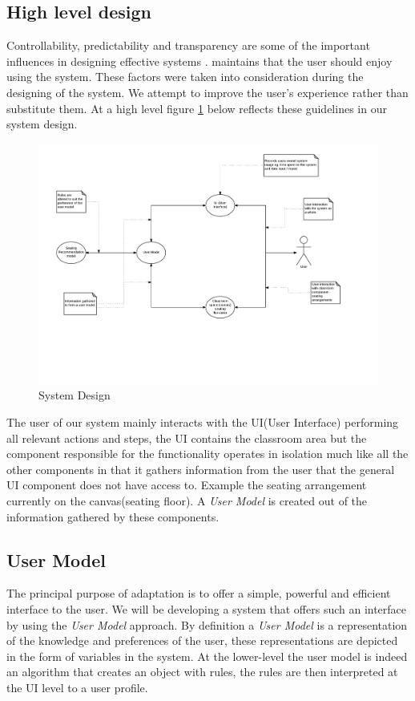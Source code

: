 \subsection{High level design}
Controllability, predictability and transparency are some of the important influences in designing effective systems \cite{hook1995glass}. \cite{rudisill1996human} maintains that the user should enjoy using the system. These factors were taken into consideration during the designing of the system. We attempt to improve the user's experience rather than substitute them. At a high level figure \ref{fig:SystemDesign} below reflects these guidelines in our system design.

\begin{figure}[!ht]
\caption{System Design}
    \label{fig:SystemDesign}
    \centering
    \includegraphics[scale=0.5]{figures/SystemDesign}
\end{figure}


The user of our system mainly interacts with the UI(User Interface) performing all relevant actions and steps, the UI contains the classroom area but the component responsible for the functionality operates in isolation much like all the other components in that it gathers information from the user that the general UI component does not have access to. Example the seating arrangement currently on the canvas(seating floor). A \emph{User Model} is created out of the information gathered by these components.

\subsection{User Model} \label{sub:UserModel}
The principal purpose of adaptation is to offer a simple, powerful and efficient interface to the user. We will be developing a system that offers such an interface by using the \emph{User Model} approach. By definition a \emph{User Model} is a representation of the knowledge and preferences of the user, these representations are depicted in the form of variables in the system. At the lower-level the user model is indeed an algorithm that creates an object with rules, the rules are then interpreted at the UI level to a user profile.

